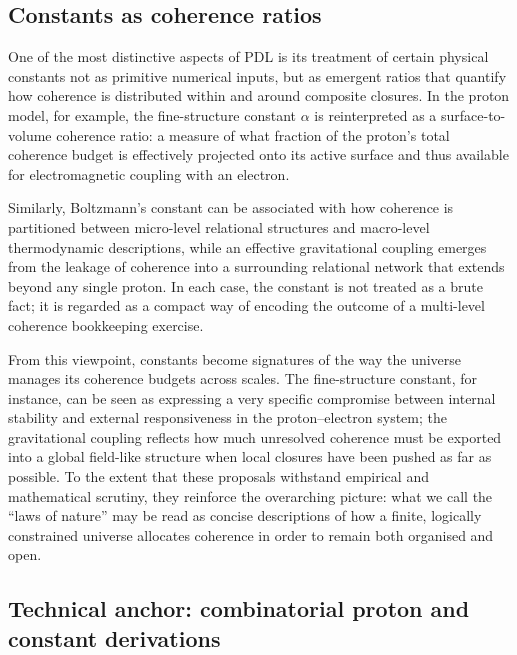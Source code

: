 \documentclass[11pt,a4paper]{article}
\theoremstyle{definition}
\begin{document}
\subsection{Constants as coherence ratios}

One of the most distinctive aspects of PDL is its treatment of certain physical constants not as primitive numerical inputs, but as emergent ratios that quantify how coherence is distributed within and around composite closures.\cite{Laubscher_Alpha_v2_2024,Laubscher_Exponent18_v2_2024,Laubscher_UniversalCoherenceLeakage_2024} In the proton model, for example, the fine-structure constant \(\alpha\) is reinterpreted as a surface-to-volume coherence ratio: a measure of what fraction of the proton’s total coherence budget is effectively projected onto its active surface and thus available for electromagnetic coupling with an electron.\cite{Laubscher_Alpha_v2_2024,Laubscher_Born_Golden_v2_2024}

Similarly, Boltzmann’s constant can be associated with how coherence is partitioned between micro-level relational structures and macro-level thermodynamic descriptions, while an effective gravitational coupling emerges from the leakage of coherence into a surrounding relational network that extends beyond any single proton.\cite{Laubscher_UniversalCoherenceLeakage_2024,Laubscher_EffectiveFields_2024,Laubscher_PDL_Position_2024} In each case, the constant is not treated as a brute fact; it is regarded as a compact way of encoding the outcome of a multi-level coherence bookkeeping exercise.

From this viewpoint, constants become signatures of the way the universe manages its coherence budgets across scales. The fine-structure constant, for instance, can be seen as expressing a very specific compromise between internal stability and external responsiveness in the proton–electron system; the gravitational coupling reflects how much unresolved coherence must be exported into a global field-like structure when local closures have been pushed as far as possible.\cite{Laubscher_Alpha_v2_2024,Laubscher_UniversalCoherenceLeakage_2024} To the extent that these proposals withstand empirical and mathematical scrutiny, they reinforce the overarching picture: what we call the ``laws of nature'' may be read as concise descriptions of how a finite, logically constrained universe allocates coherence in order to remain both organised and open.

\subsection{Technical anchor: combinatorial proton and constant derivations}
\end{document}
